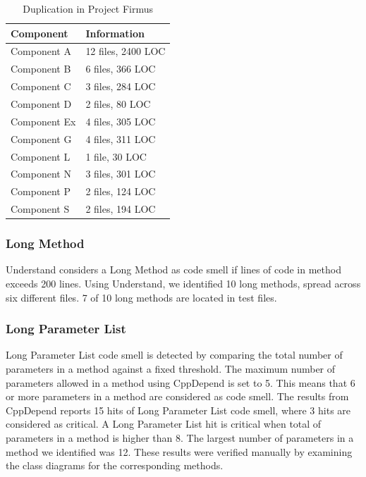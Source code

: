 \begin{table}[]
\centering
\caption{Duplication in Project Firmus}
\label{tab:duplicatedLines}
\begin{tabular}{|l|l|}
\hline
\textbf{Component}			& \textbf{Information} \\ \hline
Component A 				& 12 files, 2400 LOC \\ \hline
Component B 				& 6 files, 366 LOC \\ \hline
Component C 				& 3 files, 284 LOC \\ \hline
Component D 				& 2 files, 80 LOC \\ \hline
Component Ex 				& 4 files, 305 LOC \\ \hline
Component G 				& 4 files, 311 LOC \\ \hline
Component L 				& 1 file, 30 LOC \\ \hline
Component N 				& 3 files, 301 LOC \\ \hline
Component P 				& 2 files, 124 LOC \\ \hline
Component S 				& 2 files, 194 LOC \\ \hline
\end{tabular}
\end{table}


\subsubsection{Long Method}
Understand considers a Long Method as code smell if lines of code in method exceeds 200 lines. Using Understand, we identified 10 long methods, spread across six different files. 7 of 10 long methods are located in test files. 


\subsubsection{Long Parameter List}
Long Parameter List code smell is detected by comparing the total number of parameters in a method against a fixed threshold. The maximum number of parameters allowed in a method using CppDepend is set to 5. This means that 6 or more parameters in a method are considered as code smell. The results from CppDepend reports 15 hits of Long Parameter List code smell, where 3 hits are considered as critical. A Long Parameter List hit is critical when total of parameters in a method is higher than 8. The largest number of parameters in a method we identified was 12. These results were verified manually by examining the class diagrams for the corresponding methods.

